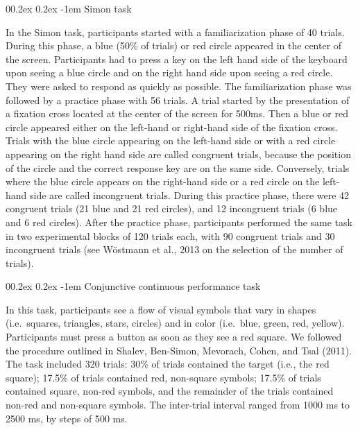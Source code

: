 \documentclass[
  man,floatsintext]{apa6}
\makeatletter
\let\oldparagraph\paragraph
\renewcommand{\paragraph}[1]{\oldparagraph{#1}\mbox{}}
\renewcommand{\paragraph}{\@startsection{paragraph}{4}{\parindent}%
  {0\baselineskip \@plus 0.2ex \@minus 0.2ex}%
  {-1em}%
  {\normalfont\normalsize\bfseries\itshape\typesectitle}}
\makeatother
\begin{document}
\hypertarget{simon-task}{%
\paragraph{Simon task}\label{simon-task}}

In the Simon task, participants started with a familiarization phase of 40 trials. During this phase, a blue (50\% of trials) or red circle appeared in the center of the screen. Participants had to press a key on the left hand side of the keyboard upon seeing a blue circle and on the right hand side upon seeing a red circle. They were asked to respond as quickly as possible. The familiarization phase was followed by a practice phase with 56 trials. A trial started by the presentation of a fixation cross located at the center of the screen for 500ms. Then a blue or red circle appeared either on the left-hand or right-hand side of the fixation cross. Trials with the blue circle appearing on the left-hand side or with a red circle appearing on the right hand side are called congruent trials, because the position of the circle and the correct response key are on the same side. Conversely, trials where the blue circle appears on the right-hand side or a red circle on the left-hand side are called incongruent trials. During this practice phase, there were 42 congruent trials (21 blue and 21 red circles), and 12 incongruent trials (6 blue and 6 red circles). After the practice phase, participants performed the same task in two experimental blocks of 120 trials each, with 90 congruent trials and 30 incongruent trials (see Wöstmann et al., 2013 on the selection of the number of trials).

\hypertarget{conjunctive-continuous-performance-task}{%
\paragraph{Conjunctive continuous performance task}\label{conjunctive-continuous-performance-task}}

In this task, participants see a flow of visual symbols that vary in shapes (i.e.~squares, triangles, stars, circles) and in color (i.e.~blue, green, red, yellow). Participants must press a button as soon as they see a red square. We followed the procedure outlined in Shalev, Ben-Simon, Mevorach, Cohen, and Tsal (2011). The task included 320 trials: 30\% of trials contained the target (i.e., the red square); 17.5\% of trials contained red, non-square symbols; 17.5\% of trials contained square, non-red symbols, and the remainder of the trials contained non-red and non-square symbols. The inter-trial interval ranged from 1000 ms to 2500 ms, by steps of 500 ms.
\end{document}

